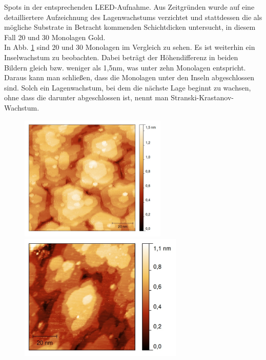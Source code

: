 \FloatBarrier

Spots in der entsprechenden
LEED-Aufnahme. Aus Zeitgründen wurde auf eine detailliertere Aufzeichnung des Lagenwachstums
verzichtet und stattdessen die als mögliche Substrate in Betracht kommenden Schichtdicken untersucht, in diesem
Fall 20 und 30 Monolagen Gold.\\
In Abb. \ref{MLVergleich} sind 20 und 30 Monolagen im Vergleich zu sehen. Es ist weiterhin ein
Inselwachstum zu beobachten.  Dabei beträgt der Höhendifferenz in beiden Bildern gleich bzw. weniger
als 1,5nm, was unter zehn Monolagen entspricht. Daraus kann man schließen, dass die Monolagen
unter den Inseln abgeschlossen sind. Solch ein Lagenwachstum, bei dem die nächste Lage beginnt zu
wachsen, ohne dass die darunter abgeschlossen ist, nennt man Stranski-Krastanov-Wachstum.


\begin{figure}[htbp]
	\begin{minipage}[b]{0.5\textwidth} 
		\includegraphics[height=6cm]{20ML.jpg}
	\end{minipage}
	\hfill
	\begin{minipage}[b]{0.5\textwidth}
		\includegraphics[height=6cm]{30ML.jpg}
	\end{minipage}
	\caption{\textit{}}
	\label{MLVergleich} 
\end{figure}

